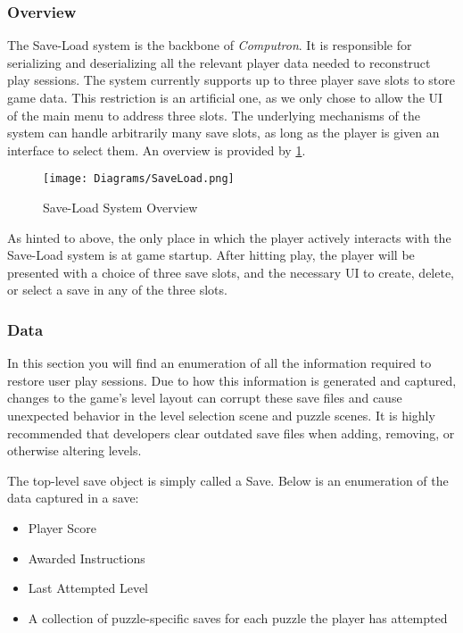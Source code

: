 \subsubsection{Overview}
The Save-Load system is the backbone of \textit{Computron}. It is responsible for serializing and deserializing all the relevant player data needed to reconstruct play sessions. The system currently supports up to three player save slots to store game data. This restriction is an artificial one, as we only chose to allow the UI of the main menu to address three slots. The underlying mechanisms of the system can handle arbitrarily many save slots, as long as the player is given an interface to select them. An overview is provided by \ref{fig:saveload_system_diagram}.

\begin{figure}[!hb]
    \caption{Save-Load System Overview}
    \label{fig:saveload_system_diagram}
    \centering
    \texttt{[image: Diagrams/SaveLoad.png]}
\end{figure}

As hinted to above, the only place in which the player actively interacts with the Save-Load system is at game startup. After hitting play, the player will be presented with a choice of three save slots, and the necessary UI to create, delete, or select a save in any of the three slots. 

\subsubsection{Data}
In this section you will find an enumeration of all the information required to restore user play sessions. Due to how this information is generated and captured, changes to the game's level layout can corrupt these save files and cause unexpected behavior in the level selection scene and puzzle scenes. It is highly recommended that developers clear outdated save files when adding, removing, or otherwise altering levels.

The top-level save object is simply called a Save. Below is an enumeration of the data captured in a save:
\begin{itemize}
    \item Player Score
    \item Awarded Instructions
    \item Last Attempted Level
    \item A collection of puzzle-specific saves for each puzzle the player has attempted
\end{itemize}

